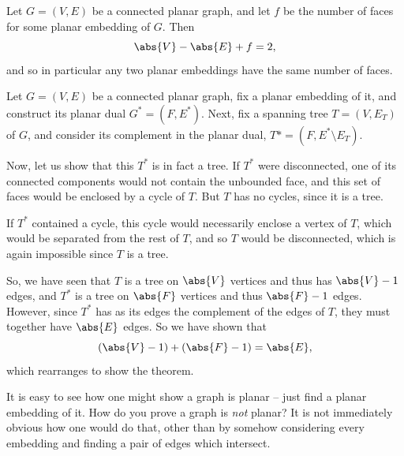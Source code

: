 \documentclass[nobib]{tufte-handout}
\begin{document}
\begin{theorem}
  Let $G = (V,E)$ be a connected planar graph, and let $f$ be the number of faces for some planar embedding of $G$. Then
  $$\abs{V} - \abs{E} + f = 2,$$
  and so in particular any two planar embeddings have the same number of faces.

  \begin{definition}
    Let $G = (V,E)$ be a connected planar graph, fix a planar embedding of it, and construct its planar dual $G^* = (F, E^*)$. Next, fix a spanning tree $T = (V, E_T)$ of $G$, and consider its complement in the planar dual, $T* = (F, E^* \setminus E_T)$.

    Now, let us show that this $T^*$ is in fact a tree. If $T^*$ were disconnected, one of its connected components would not contain the unbounded face, and this set of faces would be enclosed by a cycle of $T$. But $T$ has no cycles, since it is a tree.

    If $T^*$ contained a cycle, this cycle would necessarily enclose a vertex of $T$, which would be separated from the rest of $T$, and so $T$ would be disconnected, which is again impossible since $T$ is a tree.

    So, we have seen that $T$ is a tree on $\abs{V}$ vertices and thus has $\abs{V} - 1$ edges, and $T^*$ is a tree on $\abs{F}$ vertices and thus $\abs{F}-1$ edges. However, since $T^*$ has as its edges the complement of the edges of $T$, they must together have $\abs{E}$ edges. So we have shown that
    $$\left(\abs{V} - 1\right) + \left(\abs{F} - 1\right) = \abs{E},$$
    which rearranges to show the theorem.
  \end{definition}
\end{theorem}

It is easy to see how one might show a graph is planar -- just find a planar embedding of it. How do you prove a graph is \emph{not} planar? It is not immediately obvious how one would do that, other than by somehow considering every embedding and finding a pair of edges which intersect.
\end{document}
